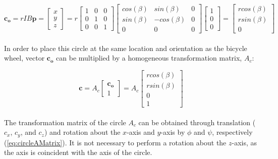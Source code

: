 \documentclass[12pt]{article}
\begin{document}
\begin{equation}
	\mathbf{c_o}=rIB\mathbf{p}=
     \begin{bmatrix}
       x\\
       y\\
       z
    \end{bmatrix}
    =r
     \begin{bmatrix}
       1 & 0 & 0 \\
       0 & 1 & 0\\
       0 & 0 & 1
    \end{bmatrix}
    \begin{bmatrix}
       cos(\beta) & sin(\beta) & 0 \\
       sin(\beta) & -cos(\beta) & 0\\
       0 & 0 & 0
    \end{bmatrix}
    \begin{bmatrix}
       1\\
       0\\
       0 
    \end{bmatrix}=
    \begin{bmatrix}
       rcos(\beta)\\
       rsin(\beta)\\
       0 
    \end{bmatrix}
    \label{eq:circleEq}
\end{equation}
\\
In order to place this circle at the same location and orientation as the bicycle wheel, vector $\mathbf{c_o}$ can be multiplied by a homogeneous transformation matrix, $A_c$: 

\begin{equation}
	\mathbf{c}=A_c
    \begin{bmatrix}
    \mathbf{c_o}\\ 1
    \end{bmatrix}
    =A_c
    \begin{bmatrix}
       rcos(\beta)\\
       rsin(\beta)\\
       0 \\
       1
    \end{bmatrix}
    \label{eq:circleEq2}
\end{equation}
\\
The transformation matrix of the circle $A_c$ can be obtained through translation ($c_x$, $c_y$, and $c_z$) and rotation about the $x$-axis and $y$-axis by $\phi$ and $\psi$, respectively  (\ref{eq:circleAMatrix}).  It is not necessary to perform a rotation about the $z$-axis, as the axis is coincident with the axis of the circle.  
\end{document}
